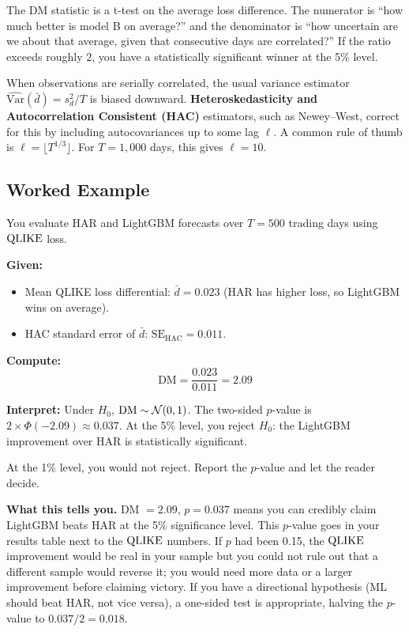 \begin{intuition}
The DM statistic is a t-test on the average loss difference.
The numerator is ``how much better is model B on average?'' and the denominator is ``how uncertain are we about that average, given that consecutive days are correlated?''
If the ratio exceeds roughly 2, you have a statistically significant winner at the 5\% level.
\end{intuition}

\begin{prereq}
When observations are serially correlated, the usual variance estimator $\widehat{\text{Var}}(\bar{d}) = s^2_d / T$ is biased downward.
\textbf{Heteroskedasticity and Autocorrelation Consistent (HAC)} estimators, such as Newey--West, correct for this by including autocovariances up to some lag $\ell$.
A common rule of thumb is $\ell = \lfloor T^{1/3} \rfloor$.
For $T = 1{,}000$ days, this gives $\ell = 10$.
\end{prereq}

\subsection{Worked Example}

\begin{workedexample}
You evaluate HAR and LightGBM forecasts over $T = 500$ trading days using $\operatorname{QLIKE}$ loss.

\textbf{Given:}
\begin{itemize}[nosep]
  \item Mean QLIKE loss differential: $\bar{d} = 0.023$ (HAR has higher loss, so LightGBM wins on average).
  \item HAC standard error of $\bar{d}$: $\text{SE}_{\text{HAC}} = 0.011$.
\end{itemize}

\textbf{Compute:}
\[
\text{DM} = \frac{0.023}{0.011} = 2.09
\]

\textbf{Interpret:}
Under $H_0$, $\text{DM} \sim \mathcal{N}(0,1)$.
The two-sided $p$-value is $2 \times \Phi(-2.09) \approx 0.037$.
At the 5\% level, you reject $H_0$: the LightGBM improvement over HAR is statistically significant.

At the 1\% level, you would not reject.
Report the $p$-value and let the reader decide.

\textbf{What this tells you.}
DM $= 2.09$, $p = 0.037$ means you can credibly claim LightGBM beats HAR at the 5\% significance level.
This $p$-value goes in your results table next to the $\operatorname{QLIKE}$ numbers.
If $p$ had been 0.15, the $\operatorname{QLIKE}$ improvement would be real in your sample but you could not rule out that a different sample would reverse it; you would need more data or a larger improvement before claiming victory.
If you have a directional hypothesis (ML should beat HAR, not vice versa), a one-sided test is appropriate, halving the $p$-value to $0.037/2 = 0.018$.
\end{workedexample}

